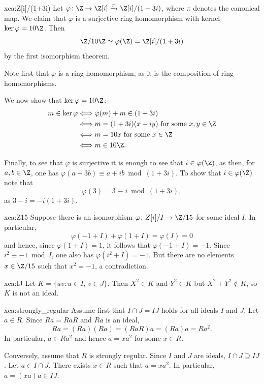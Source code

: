 \begin{sol}{xca:Z[i]/(1+3i)}
    Let $\varphi\colon\Z\to\Z[i]\xrightarrow{\pi}\Z[i]/(1+3i)$, where $\pi$ denotes the canonical map. 
    We claim that $\varphi$ is a surjective ring homomorphism with kernel $\ker\varphi=10\Z$. Then
    \[
    \Z/10\Z\simeq\varphi(\Z)=\Z[i]/(1+3i)
    \]
    by the first isomorphism theorem. 

    Note first that $\varphi$ is a ring homomorphism, as it is 
    the composition of ring homomorphisms. 
    
    We now show that $\ker\varphi=10\Z$: 
    \begin{align*} 
    m\in\ker\varphi&\Longleftrightarrow \varphi(m)+m\in (1+3i)\\
    &\Longleftrightarrow m=(1+3i)(x+iy)\text{ 
    for some $x,y\in\Z$}\\
    &\Longleftrightarrow m=10x\text{ for some $x\in\Z$}\\
    &\Longleftrightarrow m\in 10\Z.
    \end{align*}

    Finally, to see that $\varphi$ is surjective it is enough to 
    see that $i\in\varphi(\Z)$, as 
    then, for $a,b\in\Z$, one has 
    $\varphi(a+3b)\equiv a+ib\bmod (1+3i)$. 
    To show that $i\in\varphi(\Z)$
    note
    that \[
    \varphi(3)=3\equiv i\bmod (1+3i),
    \]
    as $3-i=-i(1+3i)$. 
\end{sol}



\begin{sol}{xca:Z15}
    Suppose there is an isomorphism $\varphi\colon Z[i]/I\to \Z/15$ for some 
    ideal $I$. In particular, 
    \[ 
    \varphi(-1+I)+\varphi(1+I)=\varphi(I)=0
    \]
    and hence, since $\varphi(1+I)=1$, it follows that $\varphi(-1+I)=-1$. Since 
    $i^2\equiv -1\bmod I$, one also has $\varphi(i^2+I)=-1$. But there are no
    elements $x\in\Z/15$ such that $x^2=-1$, a contradiction. 
\end{sol}

\begin{sol}{xca:IJ}
    Let $K=\{uv:u\in I,\,v\in J\}$. Then
    $X^2\in K$ and $Y^2\in K$ but $X^2+Y^2\not\in K$, so $K$ is not an ideal.
\end{sol}

\begin{sol}{xca:strongly_regular}
    Assume first that $I\cap J=IJ$ holds for all ideals $I$ and $J$. 
    Let $a\in R$. Since $Ra=RaR$ and
    $Ra$ is an ideal, 
    \[
    Ra=(Ra)(Ra)=(RaR)a=(Ra)a=Ra^2.
    \]
    In particular, $a\in Ra^2$ and 
    hence $a=xa^2$ for some $x\in R$. 
    
    Conversely, assume that $R$ is strongly regular. Since $I$ and $J$ are
    ideals, $I\cap J\supseteq IJ$. 
    Let $a\in I\cap J$. There exists $x\in R$ such that
    $a=xa^2$. In particular, 
    $a=(xa)a\in IJ$.
\end{sol}

